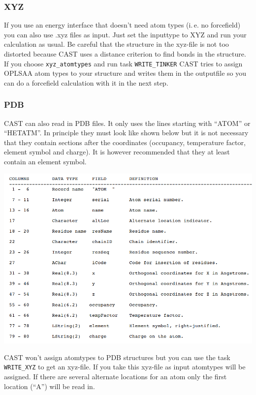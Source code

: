 \documentclass[10pt,a4paper]{article} %
\begin{document}
\subsubsection{XYZ}

If you use an energy interface that doesn't need atom types (i.\,e. no forcefield) you can also use .xyz files as input. Just set the inputtype to XYZ and run your calculation as usual. Be careful that the structure in the xyz-file is not too distorted because CAST uses a distance criterion to find bonds in the structure. If you choose \texttt{xyz\_atomtypes} and run task \texttt{WRITE\_TINKER} CAST tries to assign OPLSAA atom types to your structure and writes them in the outputfile so you can do a forcefield calculation with it in the next step.

\subsubsection{PDB}  \label{sec:pdb}

CAST can also read in PDB files. It only uses the lines starting with ``ATOM'' or ``HETATM''. In principle they must look like shown below\supercite{noauthor_protein_nodate} but it is not necessary that they contain sections after the coordinates (occupancy, temperature factor, element symbol and charge). It is however recommended that they at least contain an element symbol.

\begin{center}
	\includegraphics[width=\textwidth]{img/pdb.png}
\end{center}

CAST won't assign atomtypes to PDB structures but you can use the task \texttt{WRITE\_XYZ} to get an xyz-file. If you take this xyz-file as input atomtypes will be assigned. If there are several alternate locations for an atom only the first location (``A'') will be read in.
\end{document}
